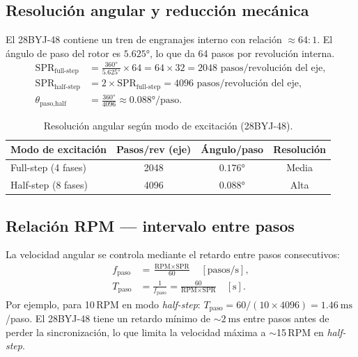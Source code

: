 \documentclass[11pt]{article}
\begin{document}
\subsection{Resolución angular y reducción mecánica}
El 28BYJ-48 contiene un tren de engranajes interno con relación $\approx 64{:}1$. El
ángulo de paso del rotor es $5.625\si{\degree}$, lo que da 64 pasos por revolución
interna.
\begin{align}
  \text{SPR}_\text{full-step} &= \frac{360\si{\degree}}{5.625\si{\degree}}\times 64 =
        64\times 32 = 2048 \text{ pasos/revolución del eje}, \\
  \text{SPR}_\text{half-step} &= 2\times\text{SPR}_\text{full-step} = 4096
        \text{ pasos/revolución del eje}, \\
  \theta_\text{paso,half} &= \frac{360\si{\degree}}{4096}\approx 0.088\si{\degree}/\text{paso}.
\end{align}
\begin{table}[H]\centering
\caption{Resolución angular según modo de excitación (28BYJ-48).}
\begin{tabular}{lccc}
\toprule
Modo de excitación & Pasos/rev (eje) & Ángulo/paso & Resolución \\
\midrule
Full-step (4 fases) & 2048 & $0.176\si{\degree}$ & Media \\
Half-step (8 fases) & 4096 & $0.088\si{\degree}$ & Alta \\
\bottomrule
\end{tabular}
\end{table}

\subsection{Relación RPM — intervalo entre pasos}
La velocidad angular se controla mediante el retardo entre pasos consecutivos:
\begin{align}
  f_\text{paso} &= \frac{\text{RPM}\times\text{SPR}}{60} \quad [\text{pasos/s}], \\
  T_\text{paso} &= \frac{1}{f_\text{paso}} = \frac{60}{\text{RPM}\times\text{SPR}} \quad [\text{s}].
\end{align}
Por ejemplo, para 10\,RPM en modo \emph{half-step}:
$T_\text{paso} = 60/(10\times 4096) = \SI{1.46}{\milli\second}$/paso. El 28BYJ-48 tiene un
retardo mínimo de $\sim\SI{2}{\milli\second}$ entre pasos antes de perder la
sincronización, lo que limita la velocidad máxima a $\sim$15\,RPM en \emph{half-step}.
\end{document}
